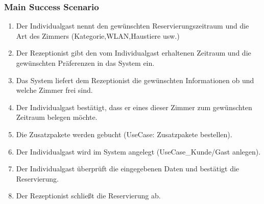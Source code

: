 \documentclass[./detailed_overview_usecases.tex]{subfiles}
\begin{document}
    \subsubsection*{Main Success Scenario}
    \begin{enumerate}
        \item Der Individualgast nennt den gewünschten Reservierungszeitraum und die Art des Zimmers (Kategorie,WLAN,Haustiere usw.)
        \item Der Rezeptionist gibt den vom Individualgast erhaltenen Zeitraum und die gewünschten Präferenzen in das System ein.
        \item Das System liefert dem Rezeptionist die gewünschten Informationen ob und welche Zimmer frei sind.
        \item Der Individualgast bestätigt, dass er eines dieser Zimmer zum gewünschten Zeitraum belegen möchte.
        \item Die Zusatzpakete werden gebucht (UseCase: Zusatzpakete bestellen).
        \item Der Individualgast wird im System angelegt (UseCase_Kunde/Gast anlegen).
        \item Der Individualgast überprüft die eingegebenen Daten und bestätigt die Reservierung.
        \item Der Rezeptionist schließt die Reservierung ab.
    \end{enumerate}
\end{document}
